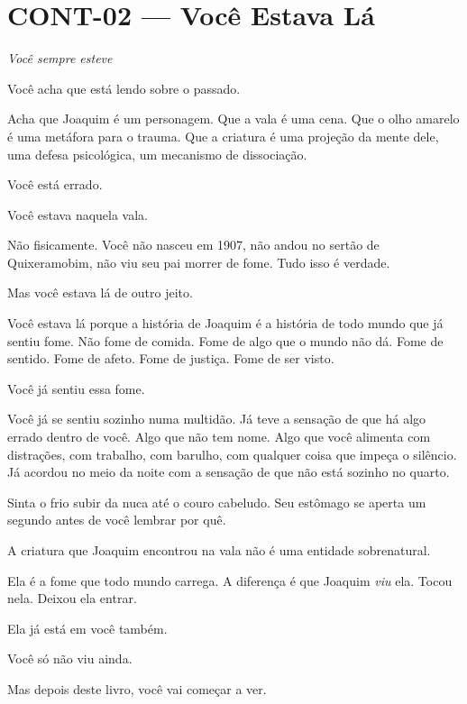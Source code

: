 \section*{\textbf{CONT-02} --- Você Estava Lá}

\noindent \textit{Você sempre esteve}

\noindent Você acha que está lendo sobre o passado.

\noindent Acha que Joaquim é um personagem. Que a vala é uma cena. Que o olho amarelo é uma metáfora para o trauma. Que a criatura é uma projeção da mente dele, uma defesa psicológica, um mecanismo de dissociação.

\noindent Você está errado.

\noindent Você estava naquela vala.

\noindent Não fisicamente. Você não nasceu em 1907, não andou no sertão de Quixeramobim, não viu seu pai morrer de fome. Tudo isso é verdade.

\noindent Mas você estava lá de outro jeito.

\noindent Você estava lá porque a história de Joaquim é a história de todo mundo que já sentiu fome. Não fome de comida. Fome de algo que o mundo não dá. Fome de sentido. Fome de afeto. Fome de justiça. Fome de ser visto.

\noindent Você já sentiu essa fome.

\noindent Você já se sentiu sozinho numa multidão. Já teve a sensação de que há algo errado dentro de você. Algo que não tem nome. Algo que você alimenta com distrações, com trabalho, com barulho, com qualquer coisa que impeça o silêncio. Já acordou no meio da noite com a sensação de que não está sozinho no quarto.

\noindent Sinta o frio subir da nuca até o couro cabeludo. Seu estômago se aperta um segundo antes de você lembrar por quê.

\noindent A criatura que Joaquim encontrou na vala não é uma entidade sobrenatural.

\noindent Ela é a fome que todo mundo carrega. A diferença é que Joaquim \textit{viu} ela. Tocou nela. Deixou ela entrar.

\noindent Ela já está em você também.

\noindent Você só não viu ainda.

\noindent Mas depois deste livro, você vai começar a ver.

